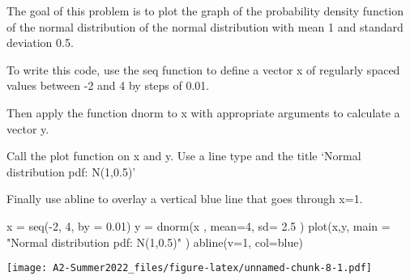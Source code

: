 \documentclass[
]{article}
\newenvironment{Shaded}{\begin{snugshade}}{\end{snugshade}}
\newcommand{\AttributeTok}[1]{\textcolor[rgb]{0.77,0.63,0.00}{#1}}
\newcommand{\DecValTok}[1]{\textcolor[rgb]{0.00,0.00,0.81}{#1}}
\newcommand{\FloatTok}[1]{\textcolor[rgb]{0.00,0.00,0.81}{#1}}
\newcommand{\FunctionTok}[1]{\textcolor[rgb]{0.00,0.00,0.00}{#1}}
\newcommand{\NormalTok}[1]{#1}
\newcommand{\OtherTok}[1]{\textcolor[rgb]{0.56,0.35,0.01}{#1}}
\newcommand{\SpecialCharTok}[1]{\textcolor[rgb]{0.00,0.00,0.00}{#1}}
\newcommand{\StringTok}[1]{\textcolor[rgb]{0.31,0.60,0.02}{#1}}
\begin{document}
The goal of this problem is to plot the graph of the probability density
function of the normal distribution of the normal distribution with mean
1 and standard deviation 0.5.

To write this code, use the seq function to define a vector x of
regularly spaced values between -2 and 4 by steps of 0.01.

Then apply the function dnorm to x with appropriate arguments to
calculate a vector y.

Call the plot function on x and y. Use a line type and the title `Normal
distribution pdf: N(1,0.5)'

Finally use abline to overlay a vertical blue line that goes through
x=1.

\begin{Shaded}
\begin{Highlighting}[]
\NormalTok{x }\OtherTok{=} \FunctionTok{seq}\NormalTok{(}\SpecialCharTok{{-}}\DecValTok{2}\NormalTok{, }\DecValTok{4}\NormalTok{, }\AttributeTok{by =} \FloatTok{0.01}\NormalTok{)}
\NormalTok{y }\OtherTok{=} \FunctionTok{dnorm}\NormalTok{(x , }\AttributeTok{mean=}\DecValTok{4}\NormalTok{, }\AttributeTok{sd=} \FloatTok{2.5}\NormalTok{ )}
\FunctionTok{plot}\NormalTok{(x,y, }\AttributeTok{main =} \StringTok{"Normal distribution pdf: N(1,0.5)"}\NormalTok{ )}
\FunctionTok{abline}\NormalTok{(}\AttributeTok{v=}\DecValTok{1}\NormalTok{, }\AttributeTok{col=}\StringTok{\textquotesingle{}blue\textquotesingle{}}\NormalTok{)}
\end{Highlighting}
\end{Shaded}

\texttt{[image: A2-Summer2022\_files/figure-latex/unnamed-chunk-8-1.pdf]}
\end{document}
